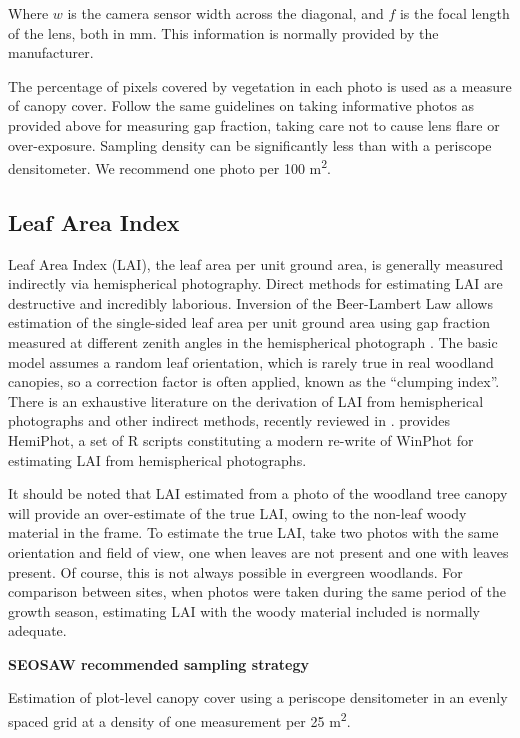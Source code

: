 \documentclass[11pt,a4paper]{article}
\begin{document}
Where $w$ is the camera sensor width across the diagonal, and $f$ is the focal length of the lens, both in mm. This information is normally provided by the manufacturer.

The percentage of pixels covered by vegetation in each photo is used as a measure of canopy cover. Follow the same guidelines on taking informative photos as provided above for measuring gap fraction, taking care not to cause lens flare or over-exposure. Sampling density can be significantly less than with a periscope densitometer. We recommend one photo per 100 m\textsuperscript{2}. 

\subsection{Leaf Area Index}

Leaf Area Index (LAI), the leaf area per unit ground area, is generally measured indirectly via hemispherical photography. Direct methods for estimating LAI are destructive and incredibly laborious. Inversion of the Beer-Lambert Law allows estimation of the single-sided leaf area per unit ground area using gap fraction measured at different zenith angles in the hemispherical photograph \citep{Chen1991, Nilson1971}. The basic model assumes a random leaf orientation, which is rarely true in real woodland canopies, so a correction factor is often applied, known as the ``clumping index''. There is an exhaustive literature on the derivation of LAI from hemispherical photographs and other indirect methods, recently reviewed in \citet{Yan2019}. \citet{Steege2018} provides HemiPhot, a set of R scripts constituting a modern re-write of WinPhot for estimating LAI from hemispherical photographs. 

It should be noted that LAI estimated from a photo of the woodland tree canopy will provide an over-estimate of the true LAI, owing to the non-leaf woody material in the frame. To estimate the true LAI, take two photos with the same orientation and field of view, one when leaves are not present and one with leaves present. Of course, this is not always possible in evergreen woodlands. For comparison between sites, when photos were taken during the same period of the growth season, estimating LAI with the woody material included is normally adequate.

\begin{framed}
{\large{\textbf{SEOSAW recommended sampling strategy}}}

Estimation of plot-level canopy cover using a periscope densitometer in an evenly spaced grid at a density of one measurement per 25 m\textsuperscript{2}. 
\end{framed}
\end{document}
